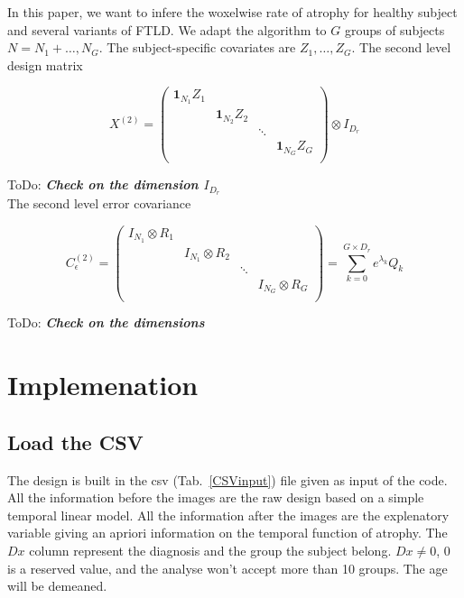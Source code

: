\documentclass[final, paper=letter,5p,times,twocolumn]{elsarticle}
\newcommand{\ToDo}[1]{ToDo: \textbf{\textit{#1}}}
\theoremstyle{definition}
\begin{document}
In this paper, we want to infere the woxelwise rate of atrophy for healthy subject and several variants of FTLD. We adapt the algorithm to $G$ groups of subjects $N = N_{1} + \dots, N_{G}$. The subject-specific covariates are $Z_{1}, \dots, Z_{G}$. The second level design matrix

\begin{equation*}
  X^{(2)} =
  \left (
  \begin{array}{cccc}
    {\bm 1}_{N_{1}}Z_{1} &&& \\
    &{\bm 1}_{N_{2}}Z_{2} && \\
    &&\ddots&\\
    &&& {\bm 1}_{N_{G}}Z_{G} \\
  \end{array}
    \right ) \otimes I_{D_{r}}
\end{equation*}

\ToDo{Check on the dimension $I_{D_{r}}$} \\
The second level error covariance
  
\begin{equation}
  C_{\epsilon}^{(2)} =
  \left (
  \begin{array}{cccc}
    I_{N_{1}} \otimes R_{1} &&& \\
    &I_{N_{1}} \otimes R_{2} && \\
    && \ddots & \\
    &&& I_{N_{G}} \otimes R_{G} \\
  \end{array}
  \right ) =  \sum_{k = 0}^{G \times D_{r}} e^{\lambda_{k}} Q_{k}
  \label{}
\end{equation}

\ToDo{Check on the dimensions} \\

\section{Implemenation}

\subsection{Load the CSV}

The design is built in the csv (Tab.~\ref{CSVinput}) file given as input of the code. All the information before the images are the raw design based on a simple temporal linear model. All the information after the images are the explenatory variable giving an apriori information on the temporal function of atrophy. The $Dx$ column represent the diagnosis and the group the subject belong. $Dx \ne 0$, 0 is a reserved value, and the analyse won't accept more than 10 groups. The age will be demeaned.
\end{document}
